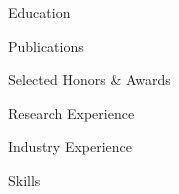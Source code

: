 \documentclass[11pt]{resume}
\begin{document}
\begin{rSection}{Education}
\end{rSection}

\begin{rSection}{Publications}
\end{rSection}

\begin{rSection}{Selected Honors \& Awards}
\end{rSection}

\begin{rSection}{Research Experience}
\end{rSection}

\begin{rSection}{Industry Experience}
\end{rSection}







\begin{rSection}{Skills}
\end{rSection}
\end{document}
